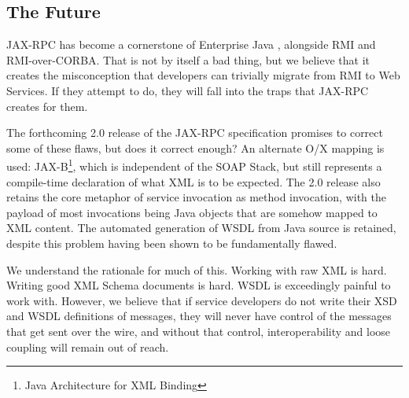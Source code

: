 
\subsection{The Future}
\label{objections:implications:future}

JAX-RPC has become a cornerstone of Enterprise Java \cite{spec:J2EE-14},
alongside RMI and RMI-over-CORBA. That is not by itself a bad thing, but we
believe that it creates the misconception that developers can trivially migrate
from RMI to Web Services. If they attempt to do, they will fall into the traps
that JAX-RPC creates for them.

The forthcoming 2.0 release of the JAX-RPC specification promises to
correct some of these flaws, but does it correct enough? An alternate
O/X mapping is used: JAX-B\footnote{Java Architecture for XML
Binding}, which is independent of the SOAP Stack, but still represents
a compile-time declaration of what XML is to be expected. The 2.0
release also retains the core metaphor of service invocation as method
invocation, with the payload of most invocations being Java objects
that are somehow mapped to XML content. The automated generation of
WSDL from Java source is retained, despite this problem having been
shown to be fundamentally flawed.

We understand the rationale for much of this. Working with raw XML is
hard.  Writing good XML Schema documents is hard. WSDL is exceedingly
painful to work with. However, we believe that if service developers
do not write their XSD and WSDL definitions of messages, they will
never have control of the messages that get sent over the wire, and
without that control, interoperability and loose coupling will remain
out of reach.  

